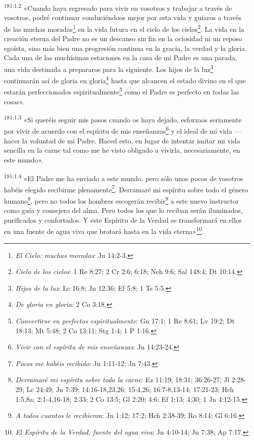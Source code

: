 \par 
\textsuperscript{181:1.2} «Cuando haya regresado para vivir en vosotros y trabajar a través de vosotros, podré continuar conduciéndoos mejor por esta vida y guiaros a través de las muchas moradas\footnote{\textit{El Cielo: muchas moradas}: Jn 14:2-3.} en la vida futura en el cielo de los cielos\footnote{\textit{Cielo de los cielos}: 1 Re 8:27; 2 Cr 2:6; 6:18; Neh 9:6; Sal 148:4; Dt 10:14.}. La vida en la creación eterna del Padre no es un descanso sin fin en la ociosidad ni un reposo egoísta, sino más bien una progresión continua en la gracia, la verdad y la gloria. Cada una de las muchísimas estaciones en la casa de mi Padre es una parada, una vida destinada a prepararos para la siguiente. Los hijos de la luz\footnote{\textit{Hijos de la luz}: Lc 16:8; Jn 12:36; Ef 5:8; 1 Ts 5:5.} continuarán así de gloria en gloria\footnote{\textit{De gloria en gloria}: 2 Co 3:18.} hasta que alcancen el estado divino en el que estarán perfeccionados espiritualmente\footnote{\textit{Convertirse en perfectos espiritualmente}: Gn 17:1; 1 Re 8:61; Lv 19:2; Dt 18:13; Mt 5:48; 2 Co 13:11; Stg 1:4; 1 P 1:16.} como el Padre es perfecto en todas las cosas».

\par 
\textsuperscript{181:1.3} «Si queréis seguir mis pasos cuando os haya dejado, esforzaos seriamente por vivir de acuerdo con el espíritu de mis enseñanzas\footnote{\textit{Vivir con el espíritu de mis enseñanzas}: Jn 14:23-24.} y el ideal de mi vida ---hacer la voluntad de mi Padre. Haced esto, en lugar de intentar imitar mi vida sencilla en la carne tal como me he visto obligado a vivirla, necesariamente, en este mundo».

\par 
\textsuperscript{181:1.4} «El Padre me ha enviado a este mundo, pero sólo unos pocos de vosotros habéis elegido recibirme plenamente\footnote{\textit{Pocos me habéis recibido}: Jn 1:11-12; Jn 7:43.}. Derramaré mi espíritu sobre todo el género humano\footnote{\textit{Derramaré mi espíritu sobre toda la carne}: Ez 11:19; 18:31; 36:26-27; Jl 2:28-29; Lc 24:49; Jn 7:39; 14:16-18,23,26; 15:4,26; 16:7-8,13-14; 17:21-23; Hch 1:5,8a; 2:1-4,16-18; 2:33; 2 Co 13:5; Gl 2:20; 4:6; Ef 1:13; 4:30; 1 Jn 4:12-15.}, pero no todos los hombres escogerán recibir\footnote{\textit{A todos cuantos le recibieron}: Jn 1:12; 17:2; Hch 2:38-39; Ro 8:14; Gl 6:16.} a este nuevo instructor como guía y consejero del alma. Pero todos los que lo reciban serán iluminados, purificados y confortados. Y este Espíritu de la Verdad se transformará en ellos en una fuente de agua viva que brotará hasta en la vida eterna»\footnote{\textit{El Espíritu de la Verdad, fuente del agua viva}: Jn 4:10-14; Jn 7:38; Ap 7:17.}.

